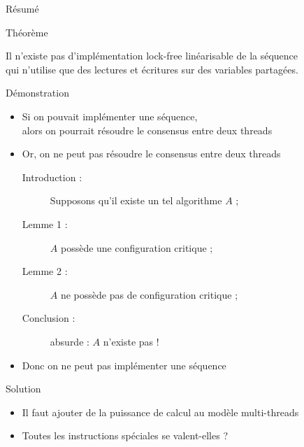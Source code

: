 
\begingroup

\begin{frame}{Résumé}

  \begin{block}{Théorème}
    \vspace{-3mm}
    \begin{center}
      Il n'existe pas d'implémentation lock-free linéarisable de la séquence\\
      qui n'utilise que des lectures et écritures sur des variables partagées.
    \end{center}
    \vspace{-2mm}
  \end{block}

  \begin{exampleblock}{Démonstration}
    \begin{itemize}
    \item[Thm1 :] Si on pouvait implémenter une séquence, \\ \hspace{5mm} alors on pourrait résoudre le consensus {\color{exampleColor}entre deux threads}
    \item[Thm2 :] Or, on ne peut pas résoudre le consensus entre deux threads
      \begin{description}
      \item[Introduction :] Supposons qu'il existe un tel algorithme $A$ ;
      \item[Lemme 1 :] $A$ possède une configuration critique ;
      \item[Lemme 2 :] $A$ ne possède pas de configuration critique ;
      \item[Conclusion :] absurde : $A$ n'existe pas !
      \end{description}
    \item[Conc :] Donc on ne peut pas implémenter une séquence
    \end{itemize}
  \end{exampleblock}

  \vspace{-2mm}
  \begin{alertblock}{Solution}
    \vspace{-1mm}
    \begin{itemize}
    \item Il faut ajouter de la puissance de calcul au modèle multi-threads
    \item Toutes les instructions spéciales se valent-elles ? 
    \end{itemize}
  \end{alertblock}

\end{frame}

\endgroup
\endinput
